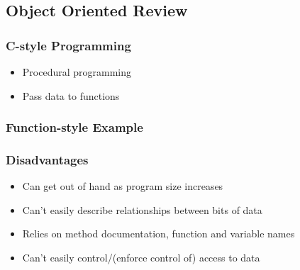 \subsection{Object Oriented Review}\label{object-oriented-review}

\subsubsection{C-style Programming}\label{c-style-programming}

\begin{itemize}
\itemsep1pt\parskip0pt
\item
  Procedural programming
\item
  Pass data to functions
\end{itemize}

\subsubsection{Function-style Example}\label{function-style-example}

\begin{Shaded}
\begin{Highlighting}[]

   
\NormalTok{\{}
\NormalTok{\}}

 
\NormalTok{\{}
\NormalTok{\}}

   
\NormalTok{\{}
\NormalTok{\}}
\end{Highlighting}
\end{Shaded}

\subsubsection{Disadvantages}\label{disadvantages}

\begin{itemize}
\itemsep1pt\parskip0pt
\item
  Can get out of hand as program size increases
\item
  Can't easily describe relationships between bits of data
\item
  Relies on method documentation, function and variable names
\item
  Can't easily control/(enforce control of) access to data
\end{itemize}

